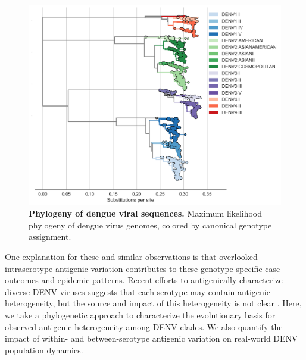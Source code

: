 \begin{figure}[h]
  \begin{centering}
    \includegraphics[width=\linewidth]{./png/genotype_tree.png}
  	\caption{\textbf{Phylogeny of dengue viral sequences.}
    Maximum likelihood phylogeny of dengue virus genomes, colored by canonical genotype assignment.
    }
  	\label{genotype_tree}
  \end{centering}
\end{figure}

One explanation for these and similar observations is that overlooked intraserotype antigenic variation contributes to these genotype-specific case outcomes and epidemic patterns.
Recent efforts to antigenically characterize diverse DENV viruses suggests that each serotype may contain antigenic heterogeneity, but the source and impact of this heterogeneity is not clear \citep{katzelnick2015dengue}.
Here, we take a phylogenetic approach to characterize the evolutionary basis for observed antigenic heterogeneity among DENV clades.
We also quantify the impact of within- and between-serotype antigenic variation on real-world DENV population dynamics.


